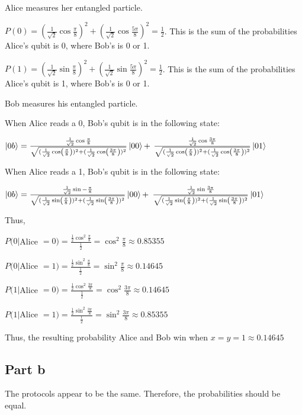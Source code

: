 \documentclass{article}
\begin{document}
\bigskip
Alice measures her entangled particle.  

\medskip
$P(0) = (\frac1{\sqrt2} \cos\frac\pi8)^2 + (\frac1{\sqrt2} \cos\frac{5\pi}8)^2 = \frac12$.  This is the sum of the probabilities Alice's qubit is 0, where Bob's is 0 or 1.

$P(1) = (\frac1{\sqrt2} \sin\frac\pi8)^2 + (\frac1{\sqrt2} \sin\frac{5\pi}8)^2 = \frac12$.  This is the sum of the probabilities Alice's qubit is 1, where Bob's is 0 or 1.

\bigskip
Bob measures his entangled particle.

\medskip

When Alice reads a 0, Bob's qubit is in the following state:

$\ket{0b}=\frac{\frac1{\sqrt2} \cos \frac\pi8}{ \sqrt{(\frac1{\sqrt{2}}\cos(\frac\pi8))^2+(\frac1{\sqrt{2}}\cos(\frac{3\pi}8))^2}} \ket{00} + $
$\frac{\frac1{\sqrt2} \cos \frac{3\pi}8}{ \sqrt{(\frac1{\sqrt{2}}\cos(\frac\pi8))^2+(\frac1{\sqrt{2}}\cos(\frac{3\pi}8))^2}} \ket{01}$

\medskip
When Alice reads a 1, Bob's qubit is in the following state:

$\ket{0b}=\frac{\frac1{\sqrt2} \sin -\frac\pi8}{ \sqrt{(\frac1{\sqrt{2}}\sin(\frac\pi8))^2+(\frac1{\sqrt{2}}\sin(\frac{3\pi}8))^2}} \ket{00} + $
$\frac{\frac1{\sqrt2} \sin \frac{3\pi}8}{ \sqrt{(\frac1{\sqrt{2}}\sin(\frac\pi8))^2+(\frac1{\sqrt{2}}\sin(\frac{3\pi}8))^2}} \ket{01}$

\medskip
Thus, 

$P(0|$Alice $=0)= \frac{\frac{1}{2} \cos^2\frac\pi8}{\frac{1}{2}} = \cos^2\frac\pi8 \approx 0.85355$

$P(0|$Alice $=1)= \frac{\frac{1}{2} \sin^2\frac\pi8}{\frac{1}{2}} = \sin^2\frac\pi8 \approx 0.14645$

$P(1|$Alice $=0)= \frac{\frac{1}{2} \cos^2\frac{3\pi}8}{\frac{1}{2}} = \cos^2\frac{3\pi}8 \approx 0.14645$

$P(1|$Alice $=1)= \frac{\frac{1}{2} \sin^2\frac{3\pi}8}{\frac{1}{2}} = \sin^2\frac{3\pi}8 \approx 0.85355$

\medskip
Thus, the resulting probability Alice and Bob win when $x=y=1 \approx  0.14645$ 

\subsection{Part b}

The protocols appear to be the same.  Therefore, the probabilities should be equal.
\end{document}
